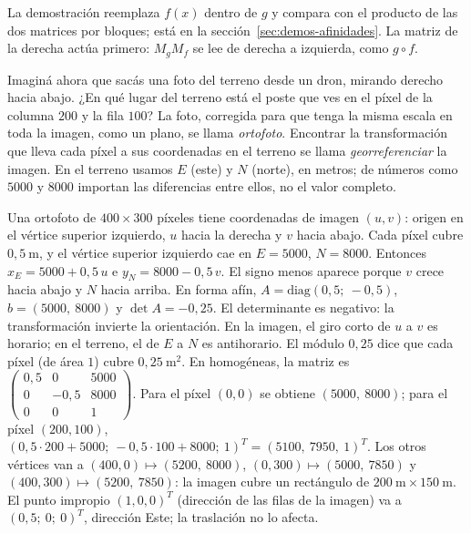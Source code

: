 La demostración reemplaza \(f(x)\) dentro de \(g\) y compara con el producto de las dos matrices
por bloques; está en la sección~\ref{sec:demos-afinidades}. La matriz de la derecha actúa
primero: \(M_gM_f\) se lee de derecha a izquierda, como \(g\circ f\).

Imaginá ahora que sacás una foto del terreno desde un dron, mirando derecho hacia abajo. ¿En
qué lugar del terreno está el poste que ves en el píxel de la columna \(200\) y la fila
\(100\)? La foto, corregida para que tenga la misma escala en toda la imagen, como un plano, se
llama \emph{ortofoto}. Encontrar la transformación que lleva cada píxel a sus coordenadas en el
terreno se llama \emph{georreferenciar} la imagen. En el terreno usamos \(E\) (este) y \(N\)
(norte), en metros; de números como \(5000\) y \(8000\) importan las diferencias entre ellos,
no el valor completo.

\begin{ejemplo}\label{ej:06-dron}
Una ortofoto de \(400\times300\) píxeles tiene coordenadas de imagen \((u,v)\): origen en el
vértice superior izquierdo, \(u\) hacia la derecha y \(v\) hacia abajo. Cada píxel cubre
\(0{,}5\ \mathrm{m}\), y el vértice superior izquierdo cae en \(E=5000\), \(N=8000\). Entonces
\(x_E=5000+0{,}5\,u\) e \(y_N=8000-0{,}5\,v\). El signo menos aparece porque \(v\) crece hacia abajo y \(N\) hacia arriba. En forma afín,
\(A=\mathrm{diag}(0{,}5;\ -0{,}5)\), \(b=(5000,\ 8000)\) y \(\det A=-0{,}25\). El determinante es negativo: la transformación invierte la orientación. En la imagen, el
giro corto de \(u\) a \(v\) es horario; en el terreno, el de \(E\) a \(N\) es antihorario.
El módulo \(0{,}25\) dice que cada píxel (de área \(1\)) cubre \(0{,}25\ \mathrm{m}^2\).
En homogéneas, la matriz es
\(\left(\begin{smallmatrix}0{,}5&0&5000\\0&-0{,}5&8000\\0&0&1\end{smallmatrix}\right)\). Para el píxel \((0,0)\) se obtiene \((5000,\ 8000)\); para el píxel \((200,100)\),
\((0{,}5\cdot200+5000;\ -0{,}5\cdot100+8000;\ 1)^T=(5100,\ 7950,\ 1)^T\). Los otros vértices van a \((400,0)\mapsto(5200,\ 8000)\), \((0,300)\mapsto(5000,\ 7850)\) y
\((400,300)\mapsto(5200,\ 7850)\): la imagen cubre un rectángulo de
\(200\ \mathrm{m}\times150\ \mathrm{m}\). El punto impropio \((1,0,0)^T\) (dirección de las
filas de la imagen) va a \((0{,}5;\ 0;\ 0)^T\), dirección Este; la traslación no lo afecta.
\end{ejemplo}

